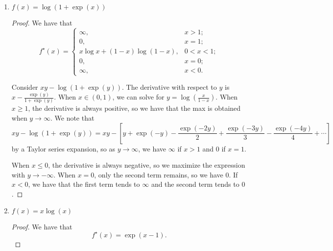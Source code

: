 \documentclass[11pt]{amsart}
\begin{document}
\begin{enumerate}
\begin{enumerate}
\begin{proof}
    To see this, we can maximize
    $\left\langle x, y \right\rangle - \exp\left(y\right)$ with respect to $y$
    by taking the derivative, setting it to $0$, and solving for $y$. In doing
    so, we find that $y = \log x$, which is only defined when $x > 0$. When
    $x \leq 0$, we see that we can maximize $xy - \exp\left(y\right)$ by sending
    $y$ to $-\infty$.
  \end{proof}
\item $f(x) =  \log(1+\exp(x))$
  \begin{proof}
    We have that
    \begin{equation*}
      \boxed{f^\star(x) =
        \begin{cases}
          \infty, &x > 1; \\
          0, &x = 1; \\
          x\log x + \left(1 - x\right)\log\left(1 - x\right), & 0 < x < 1; \\
          0, & x = 0; \\
          \infty, &x < 0.
        \end{cases}}
    \end{equation*}

    Consider $xy - \log(1+\exp(y))$. The derivative with respect to $y$ is
    $x - \frac{\exp(y)}{1+\exp(y)}$. When $x \in \left(0, 1\right)$, we can
    solve for $y = \log\left(\frac{x}{1 - x}\right)$. When $x \geq 1$, the
    derivative is always positive, so we have that the max is obtained when
    $y \rightarrow \infty$. We note that
    \begin{equation*}
      xy - \log(1+\exp(y)) = xy - \left[
        y + \exp(-y) - \frac{\exp(-2y)}{2} + \frac{\exp(-3y)}{3} - \frac{\exp(-4y)}{4} + \cdots
      \right]
    \end{equation*}
    by a Taylor series expansion, so as $y \rightarrow \infty$, we have $\infty$
    if $x > 1$ and $0$ if $x = 1$.

    When $x \leq 0$, the derivative is always negative, so we maximize the
    expression with $y \rightarrow -\infty$. When $x = 0$, only the second term
    remains, so we have $0$. If $x < 0$, we have that the first term tends to
    $\infty$ and the second term tends to $0$.
  \end{proof}
\item $f(x) = x\log(x)$
  \begin{proof}
    We have that
    \begin{equation*}
      \boxed{f^\star(x) = \exp\left(x - 1\right).}
    \end{equation*}


\end{proof}
\end{enumerate}
\end{enumerate}
\end{document}

